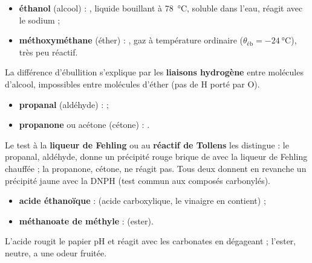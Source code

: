 \documentclass[11pt]{article}
\begin{document}
\begin{exemplebox}
\begin{itemize}
\item \textbf{éthanol} (alcool) : , liquide bouillant à \SI{78}{\celsius}, soluble dans l'eau, réagit avec le sodium ;
\item \textbf{méthoxyméthane} (éther) : , gaz à température ordinaire ($\theta_{\text{éb}} = \SI{-24}{\celsius}$), très peu réactif.
\end{itemize}
La différence d'ébullition s'explique par les \textbf{liaisons hydrogène} entre molécules d'alcool, impossibles entre molécules d'éther (pas de H porté par O).
\end{exemplebox}

\begin{exemplebox}
\begin{itemize}
\item \textbf{propanal} (aldéhyde) :  ;
\item \textbf{propanone} ou acétone (cétone) : .
\end{itemize}
Le test à la \textbf{liqueur de Fehling} ou au \textbf{réactif de Tollens} les distingue : le propanal, aldéhyde, donne un précipité rouge brique de  avec la liqueur de Fehling chauffée ; la propanone, cétone, ne réagit pas. Tous deux donnent en revanche un précipité jaune avec la DNPH (test commun aux composés carbonylés).
\end{exemplebox}

\begin{exemplebox}
\begin{itemize}
\item \textbf{acide éthanoïque} :  (acide carboxylique, le vinaigre en contient) ;
\item \textbf{méthanoate de méthyle} :  (ester).
\end{itemize}
L'acide rougit le papier pH et réagit avec les carbonates en dégageant  ; l'ester, neutre, a une odeur fruitée.
\end{exemplebox}
\end{document}
